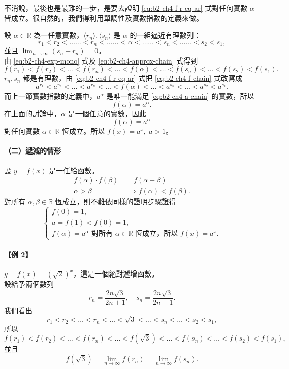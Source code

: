 不消說，最後也是最難的一步，是要去證明 \eqref{eq:b2-ch4-f-r-eq-ar} 式對任何實數 $\alpha$ 皆成立。很自然的，我們得利用單調性及實數指數的定義來做。

設 $\alpha \in \mathbb{R}$ 為一任意實數，$\langle r_n \rangle, \langle s_n \rangle$ 是 $\alpha$ 的一組逼近有理數列：
\begin{equation}\tag{10}
r_1 < r_2 < \dots\dots < r_n < \dots\dots < \alpha < \dots\dots < s_n < \dots\dots < s_2 < s_1, \label{eq:b2-ch4-approx-chain}
\end{equation}
並且 $\lim_{n\to\infty}(s_n - r_n) = 0$。\\
由 \eqref{eq:b2-ch4-exp-mono} 式及 \eqref{eq:b2-ch4-approx-chain} 式得到
\begin{equation}\tag{11}
f(r_1) < f(r_2) < \dots < f(r_n) < \dots < f(\alpha) < \dots < f(s_n) < \dots < f(s_2) < f(s_1). \label{eq:b2-ch4-f-chain}
\end{equation}
$r_n, s_n$ 都是有理數，由 \eqref{eq:b2-ch4-f-r-eq-ar} 式把 \eqref{eq:b2-ch4-f-chain} 式改寫成
\begin{equation}\tag{12}
a^{r_1} < a^{r_2} < \dots < a^{r_n} < \dots < f(\alpha) < \dots < a^{s_n} < \dots < a^{s_2} < a^{s_1}. \label{eq:b2-ch4-a-chain}
\end{equation}
而上一節實數指數的定義中，$a^\alpha$ 是唯一能滿足 \eqref{eq:b2-ch4-a-chain} 的實數，所以
\[
f(\alpha) = a^\alpha.
\]
在上面的討論中，$\alpha$ 是一個任意的實數，因此
\[
f(\alpha) = a^\alpha
\]
對任何實數 $\alpha \in \mathbb{R}$ 恆成立。所以 $f(x) = a^x,\; a > 1$。

\paragraph{（二）遞減的情形}
設 $y = f(x)$ 是一任給函數。
\begin{align*}
f(\alpha)\cdot f(\beta) &= f(\alpha+\beta) \\
\alpha > \beta &\implies f(\alpha) < f(\beta).
\end{align*}
對所有 $\alpha, \beta \in \mathbb{R}$ 恆成立，則不難依同樣的證明步驟證得
\[
\begin{cases}
f(0) = 1, \\
a = f(1) < f(0) = 1, \\
f(\alpha) = a^\alpha \text{ 對所有 } \alpha \in \mathbb{R} \text{ 恆成立，所以 } f(x) = a^x.
\end{cases}
\]

\paragraph{【例 2】} $y = f(x) = (\sqrt{2})^x$，這是一個絕對遞增函數。\\
設給予兩個數列
\[
r_n = \frac{2n\sqrt{3}}{2n+1},\quad s_n = \frac{2n\sqrt{3}}{2n-1}.
\]
我們看出
\[
r_1 < r_2 < \dots < r_n < \dots < \sqrt{3} < \dots < s_n < \dots < s_2 < s_1,
\]
所以
\[
f(r_1) < f(r_2) < \dots < f(r_n) < \dots < f(\sqrt{3}) < \dots < f(s_n) < \dots < f(s_2) < f(s_1),
\]
並且
\[
f(\sqrt{3}) = \lim_{n\to\infty} f(r_n) = \lim_{n\to\infty} f(s_n).
\]

